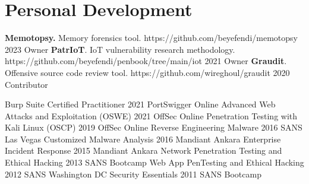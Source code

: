 

\section{Personal Development}

    
        \titleLinkYearRolePlace
            {\textbf{Memotopsy.} Memory forensics tool.}
            {https://github.com/beyefendi/memotopsy}
            {2023}
            {Owner}
            {}
        \titleLinkYearRolePlace
            {\textbf{PatrIoT}. IoT vulnerability research methodology.}
            {https://github.com/beyefendi/penbook/tree/main/iot}
            {2021}
            {Owner}
            {}
        \titleLinkYearRolePlace
            {\textbf{Graudit}. Offensive source code review tool.}
            {https://github.com/wireghoul/graudit}
            {2020}
            {Contributor}
            {}
            
    \itemizeCVEnd

  
        
        \titleLinkYearRolePlace
            {Burp Suite Certified Practitioner}
            {}
            {2021}
            {PortSwigger}
            {Online}
        \titleLinkYearRolePlace
            {Advanced Web Attacks and Exploitation (OSWE)}
            {}
            {2021}
            {OffSec}
            {Online}
        \titleLinkYearRolePlace
            {Penetration Testing with Kali Linux (OSCP)}
            {}
            {2019}
            {OffSec}
            {Online}
        \titleLinkYearRolePlace
            {Reverse Engineering Malware}
            {}
            {2016}
            {SANS}
            {Las Vegas}
        \titleLinkYearRolePlace
            {Customized Malware Analysis}
            {}
            {2016}
            {Mandiant}
            {Ankara}
        \titleLinkYearRolePlace
            {Enterprise Incident Response}
            {}
            {2015}
            {Mandiant}
            {Ankara}
        \titleLinkYearRolePlace
            {Network Penetration Testing and Ethical Hacking}
            {}
            {2013}
            {SANS}
            {Bootcamp}
        \titleLinkYearRolePlace
            {Web App PenTesting and Ethical Hacking}
            {}
            {2012}
            {SANS}
            {Washington DC}        
        \titleLinkYearRolePlace
            {Security Essentials}
            {}
            {2011}
            {SANS}
            {Bootcamp}

